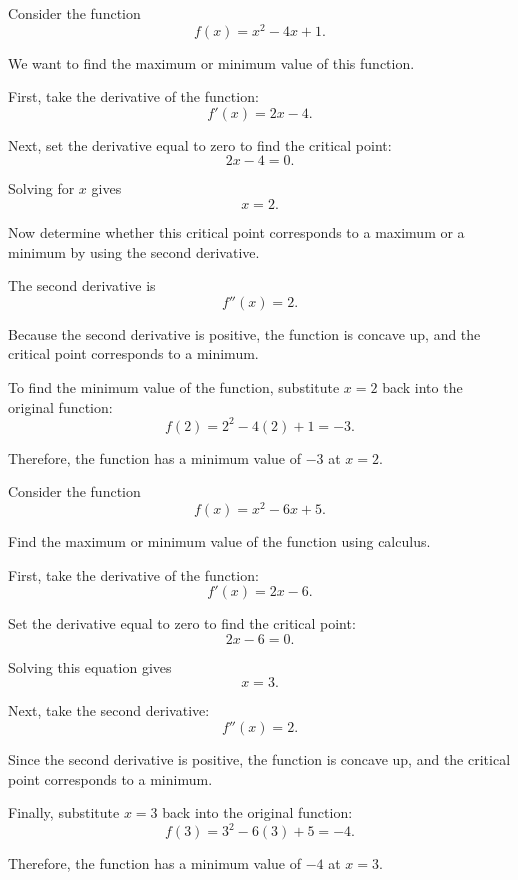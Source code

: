 \begin{Worked}
\begin{Problem}
Consider the function
\[
f(x) = x^2 - 4x + 1.
\]

We want to find the maximum or minimum value of this function.
\end{Problem}
\begin{Solution}
First, take the derivative of the function:
\[
f'(x) = 2x - 4.
\]

Next, set the derivative equal to zero to find the critical point:
\[
2x - 4 = 0.
\]

Solving for $x$ gives
\[
x = 2.
\]

Now determine whether this critical point corresponds to a maximum or a
minimum by using the second derivative.

The second derivative is
\[
f''(x) = 2.
\]

Because the second derivative is positive, the function is concave up,
and the critical point corresponds to a minimum.

To find the minimum value of the function, substitute $x = 2$ back into
the original function:
\[
f(2) = 2^2 - 4(2) + 1 = -3.
\]

Therefore, the function has a minimum value of $-3$ at $x = 2$.
\end{Solution}
\end{Worked}

\begin{Exercise}[label = optimization1]
Consider the function
\[
f(x) = x^2 - 6x + 5.
\]

Find the maximum or minimum value of the function using calculus.
\end{Exercise}

\begin{Answer}[ref=optimization1]

First, take the derivative of the function:
\[
f'(x) = 2x - 6.
\]

Set the derivative equal to zero to find the critical point:
\[
2x - 6 = 0.
\]

Solving this equation gives
\[
x = 3.
\]

Next, take the second derivative:
\[
f''(x) = 2.
\]

Since the second derivative is positive, the function is concave up, and
the critical point corresponds to a minimum.

Finally, substitute $x = 3$ back into the original function:
\[
f(3) = 3^2 - 6(3) + 5 = -4.
\]

Therefore, the function has a minimum value of $-4$ at $x = 3$.
\end{Answer}

